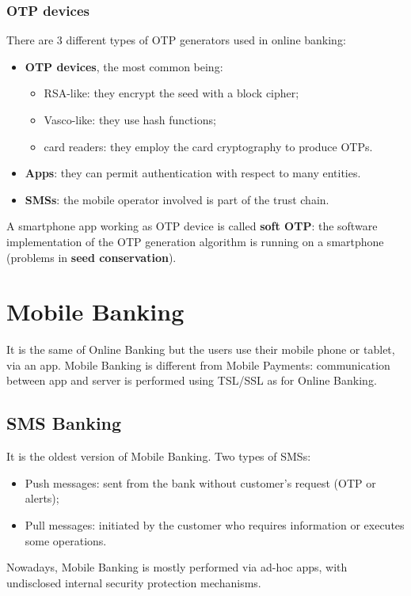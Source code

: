 \documentclass[a4paper, 10pt, titlepage]{article}
\begin{document}
\subsubsection*{OTP devices}
There are 3 different types of OTP generators used in online banking:
\begin{itemize}
\item \textbf{OTP devices}, the most common being:
	\begin{itemize}
	\item RSA-like: they encrypt the seed with a block cipher;
	\item Vasco-like: they use hash functions;
	\item card readers: they employ the card cryptography to produce OTPs.
	\end{itemize}
\item \textbf{Apps}: they can permit authentication with respect to many entities.
\item \textbf{SMSs}: the mobile operator involved is part of the trust chain.
\end{itemize}
A smartphone app working as OTP device is called \textbf{soft OTP}: the software implementation of the OTP generation algorithm is running on a smartphone (problems in \textbf{seed conservation}).

\section{Mobile Banking}
It is the same of Online Banking but the users use their mobile phone or tablet, via an app. Mobile Banking is different from Mobile Payments: communication between app and server is performed using TSL/SSL as for Online Banking.

\subsection{SMS Banking}
It is the oldest version of Mobile Banking. Two types of SMSs:
\begin{itemize}
\item Push messages: sent from the bank without customer's request (OTP or alerts);
\item Pull messages: initiated by the customer who requires information or executes some operations.
\end{itemize}
Nowadays, Mobile Banking is mostly performed via ad-hoc apps, with undisclosed internal security protection mechanisms.
\end{document}
